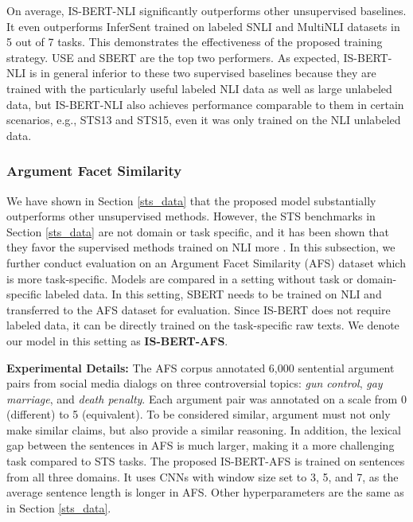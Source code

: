 \documentclass[11pt,a4paper]{article}
\begin{document}
On average, IS-BERT-NLI significantly outperforms other unsupervised baselines. It even outperforms InferSent trained on labeled SNLI and MultiNLI datasets in 5 out of 7 tasks. This demonstrates the effectiveness of the proposed training strategy. USE and SBERT are the top two performers. 
As expected, IS-BERT-NLI is in general inferior to these two supervised baselines because they are trained with the particularly useful labeled NLI data as well as large unlabeled data, but IS-BERT-NLI also achieves performance comparable to them in certain scenarios, e.g., STS13 and STS15, even it was only trained on the NLI unlabeled data. 






\subsubsection{Argument Facet Similarity} \label{afs_data}

We have shown in Section \ref{sts_data} that the proposed model substantially outperforms other unsupervised methods. 
However, the STS benchmarks in Section \ref{sts_data} are not domain or task specific, and it has been shown that they favor the supervised methods trained on NLI more \cite{hill2016,cer2018}. 
In this subsection, we further conduct evaluation on an Argument Facet Similarity (AFS) dataset \cite{misra2016} which is more task-specific. Models are compared in a setting without task or domain-specific labeled data. In this setting, SBERT needs to be trained on NLI and transferred to the AFS dataset for evaluation. Since IS-BERT does not require labeled data, it can be directly trained on the task-specific raw texts. We denote our model in this setting as {\textbf{IS-BERT-AFS}}.
\medskip

\noindent\textbf{Experimental Details:} The AFS corpus annotated 6,000 sentential argument pairs from social media dialogs on three controversial topics: \emph{gun control}, \emph{gay marriage}, and \emph{death penalty}. Each argument pair was annotated on a scale from 0 (different) to 5 (equivalent). To be considered similar, argument must not only make similar claims, but also provide a similar reasoning. In addition, the lexical gap between the sentences in AFS is much larger, making it a more challenging task compared to STS tasks. The proposed IS-BERT-AFS is trained on sentences from all three domains. It uses CNNs with window size set to 3, 5, and 7, as the average sentence length is longer in AFS.  Other hyperparameters are the same as in Section \ref{sts_data}.
\medskip
\end{document}

